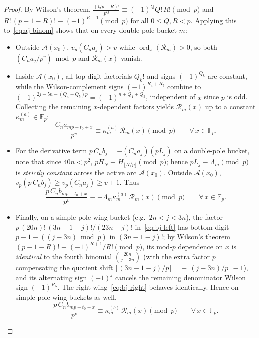 \documentclass[11pt,reqno]{amsart}
\theoremstyle{definition}
\theoremstyle{remark}
\newcommand{\FF}{\mathbb{F}}
\newcommand{\ord}{\operatorname{ord}}
\begin{document}
\begin{proof}
By Wilson's theorem, $\frac{(Qp+R)!}{p^Q} \equiv (-1)^Q Q!\, R! \pmod p$ and $R!\,(p - 1 - R)! \equiv (-1)^{R+1} \pmod p$ for all $0 \le Q, R < p$. Applying this to~\eqref{eq:aj-binom} shows that on every double-pole bucket $m$:
\begin{itemize}
  \item Outside $\mathcal{A}(x_0)$, $v_p(C_n a_j) > v$ while $\ord_x(\mathcal{R}_m) > 0$, so both $(C_n a_j/p^v) \bmod p$ and $\mathcal{R}_m(x)$ vanish.
  \item Inside $\mathcal{A}(x_0)$, all top-digit factorials $Q_k!$ and signs $(-1)^{Q_k}$ are constant, while the Wilson-complement signs $(-1)^{R_4 + R_5}$ combine to $(-1)^{2j-5n-(Q_4+Q_5)p} = (-1)^{n+Q_4+Q_5}$, independent of $x$ since $p$ is odd. Collecting the remaining $x$-dependent factors yields $\mathcal{R}_m(x)$ up to a constant $\kappa_m^{(a)} \in \FF_p$:
  \[
    \frac{C_n a_{mp - t_0 + x}}{p^v} \equiv \kappa_m^{(a)}\, \mathcal{R}_m(x) \pmod p \qquad \forall\, x \in \FF_p.
  \]
  \item For the derivative term $p\,C_n b_j = -(C_n a_j)(p L_j)$ on a double-pole bucket, note that since $40n < p^2$, $p H_N \equiv H_{\lfloor N/p \rfloor} \pmod p$; hence $p L_j \equiv \Lambda_m \pmod p$ is \emph{strictly constant} across the active arc $\mathcal{A}(x_0)$. Outside $\mathcal{A}(x_0)$, $v_p(p\,C_n b_j) \ge v_p(C_n a_j) \ge v + 1$. Thus
  \[
    \frac{p\, C_n b_{mp - t_0 + x}}{p^v} \equiv -\Lambda_m \kappa_m^{(a)}\, \mathcal{R}_m(x) \pmod p \qquad \forall\, x \in \FF_p.
  \]
  \item Finally, on a simple-pole wing bucket (e.g.\ $2n < j < 3n$), the factor $p\,(20n)!\,(3n-1-j)!/(23n-j)!$ in~\eqref{eq:bj-left} has bottom digit $p - 1 - ((j - 3n)\bmod p)$ in $(3n - 1 - j)!$; by Wilson's theorem $(p - 1 - R)! \equiv (-1)^{R+1}/R! \pmod p$, its mod-$p$ dependence on $x$ is \emph{identical} to the fourth binomial $\binom{20n}{j-3n}$ (with the extra factor $p$ compensating the quotient shift $\lfloor(3n-1-j)/p\rfloor = -\lfloor(j-3n)/p\rfloor - 1$), and its alternating sign $(-1)^j$ cancels the remaining denominator Wilson sign $(-1)^{R_5}$. The right wing~\eqref{eq:bj-right} behaves identically. Hence on simple-pole wing buckets as well,
  \[
    \frac{p\, C_n b_{mp - t_0 + x}}{p^v} \equiv \kappa_m^{(b)}\, \mathcal{R}_m(x) \pmod p \qquad \forall\, x \in \FF_p.
  \]
\end{itemize}


\end{proof}
\end{document}
